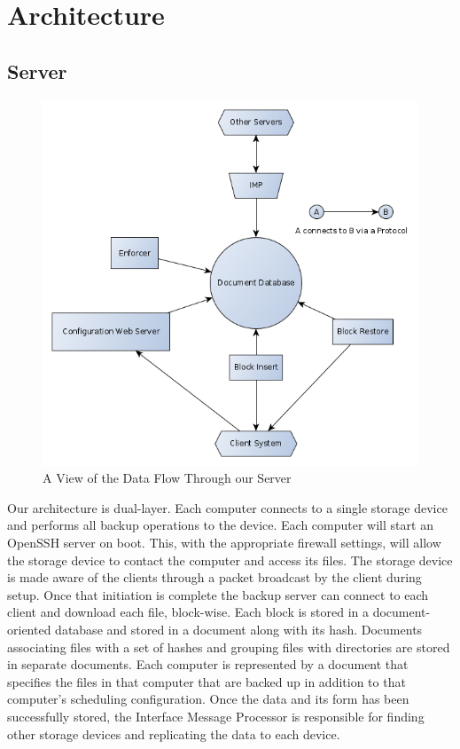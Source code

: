 \chapter{Architecture}
\section{Server}

\begin{figure}[hb]
\centering
\includegraphics[scale=0.5]{images/architechure-diagram.png}
\caption{A View of the Data Flow Through our Server}
\end{figure}

Our architecture is dual-layer. Each computer connects to a single storage
device and performs all backup operations to the device. Each computer will start
an OpenSSH server on boot. This, with the appropriate firewall settings, will
allow the storage device to contact the computer and access its files. The
storage device is made aware of the clients through a packet broadcast by the
client during setup. Once that initiation is complete the backup server can
connect to each client and download each file, block-wise. Each block is stored
in a document-oriented database and stored in a document along with its hash.
Documents associating files with a set of hashes and grouping files with
directories are stored in separate documents. Each computer is represented by a
document that specifies the files in that computer that are backed up in
addition to that computer's scheduling configuration. Once the data and its form
has been successfully stored, the Interface Message Processor is responsible for
finding other storage devices and replicating the data to each device.

